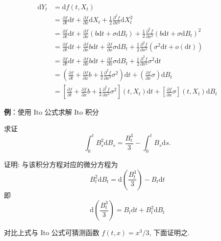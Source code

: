 \documentclass[openany]{ctexbook}
\theoremstyle{kaiti}
\theoremstyle{normal}
\begin{document}
\begin{equation}
  \begin{aligned}
    \mathrm{d}Y_t&=\mathrm{d}f(t,X_t)\\
    &=\frac{\partial f}{\partial t}\mathrm{d}t+\frac{\partial f}{\partial x}\mathrm{d}X_t+\frac{1}{2}\frac{\partial^2 f}{\partial x^2}\mathrm{d}X_t^2\\
    &=\frac{\partial f}{\partial t}\mathrm{d}t+\frac{\partial f}{\partial x}(b\mathrm{d}t+\sigma\mathrm{d}B_t)+\frac{1}{2}\frac{\partial^2 f}{\partial x^2}(b\mathrm{d}t+\sigma\mathrm{d}B_t)^2\\
    &=\frac{\partial f}{\partial t}\mathrm{d}t+\frac{\partial f}{\partial x}b\mathrm{d}t+\frac{\partial f}{\partial x}\sigma\mathrm{d}B_t+\frac{1}{2}\frac{\partial^2 f}{\partial x^2}(\sigma^2\mathrm{d}t+o(\mathrm{d}t))\\
    &=\frac{\partial f}{\partial t}\mathrm{d}t+\frac{\partial f}{\partial x}b\mathrm{d}t+\frac{\partial f}{\partial x}\sigma\mathrm{d}B_t+\frac{1}{2}\frac{\partial^2 f}{\partial x^2}\sigma^2\mathrm{d}t\\
    &=\left(\frac{\partial f}{\partial t}+\frac{\partial f}{\partial x}b+\frac{1}{2}\frac{\partial^2 f}{\partial x^2}\sigma^2\right)\mathrm{d}t+\left(\frac{\partial f}{\partial x}\sigma\right)\mathrm{d}B_t\\
    &=\left[\frac{\partial f}{\partial t}+\frac{\partial f}{\partial x}b+\frac{1}{2}\frac{\partial^2 f}{\partial x^2}\sigma^2\right](t,X_t)\mathrm{d}t+\left[\frac{\partial f}{\partial x}\sigma\right](t,X_t)\mathrm{d}B_t
  \end{aligned}
\end{equation}

\textbf{例}：使用 Ito 公式求解 Ito 积分

求证
\begin{equation}
  \int_0^tB_s^2\mathrm{d}B_s=\frac{B_t^3}{3}-\int_0^tB_s\mathrm{d}s.
\end{equation}


证明: 与该积分方程对应的微分方程为
\begin{equation}
  B_t^2\mathrm{d}B_t=\mathrm{d}\left(\frac{B_t^3}{3}\right)-B_t\mathrm{d}t
\end{equation}
即
\begin{equation}
  \mathrm{d}\left(\frac{B_t^3}{3}\right)=B_t\mathrm{d}t+B_t^2\mathrm{d}B_t
\end{equation}

对比上式与 Ito 公式可猜测函数 $f(t,x)=x^3/3$, 下面证明之.
\end{document}
